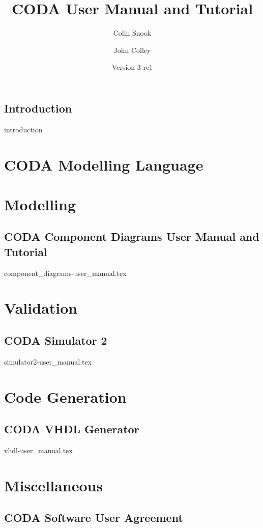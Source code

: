 \documentclass[a4paper,10pt]{book}
\title{CODA User Manual and Tutorial}
\author{Colin Snook \and John Colley}
\date{%
  Version 3 rc1\\%
  \displaydate{CODAManualDate}%
}
\begin{document}
\maketitle

\tableofcontents

\chapter{Introduction}
{introduction}

\part{CODA Modelling Language}

\part{Modelling}

\chapter{CODA Component Diagrams User Manual and Tutorial}
\label{cha:coda-component-user}
{component_diagrams-user_manual.tex}

\part{Validation}

\chapter{CODA Simulator 2}
\label{cha:coda-simulator-2}

{simulator2-user_manual.tex}

\part{Code Generation}

\chapter{CODA VHDL Generator}
\label{cha:coda-vhdl-user}

{vhdl-user_manual.tex}

\part{Miscellaneous}
\label{part:miscellaneous}

\chapter{CODA Software User Agreement}
\label{cha:coda-software-user-agreement}

\end{document}
